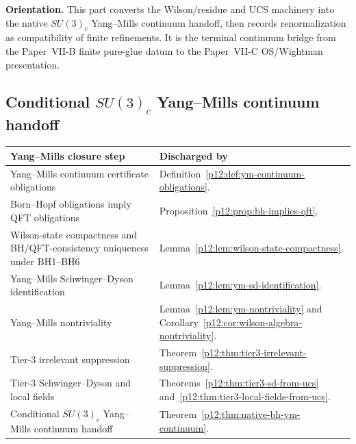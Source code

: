 \documentclass[12pt,a4paper]{article}
\begin{document}
\noindent\textbf{Orientation.}
This part converts the Wilson/residue and UCS machinery into the native \(SU(3)_c\) Yang--Mills continuum handoff, then records renormalization as compatibility of finite refinements.  It is the terminal continuum bridge from the Paper~VII-B finite pure-glue datum to the Paper~VII-C OS/Wightman presentation.


\subsection{Conditional \(SU(3)_c\) Yang--Mills continuum handoff}
\label{p12:sec:ym-identification}


\begin{table}[htbp]
\centering
\small
\begin{tabularx}{\textwidth}{@{}
>{\raggedright\arraybackslash}p{}
>{\raggedright\arraybackslash}X
@{}}
\toprule
\textbf{Yang--Mills closure step} & \textbf{Discharged by} \\
\midrule
Yang--Mills continuum certificate obligations
& Definition~\ref{p12:def:ym-continuum-obligations}. \\

Born--Hopf obligations imply QFT obligations
& Proposition~\ref{p12:prop:bh-implies-qft}. \\

Wilson-state compactness and BH/QFT-consistency uniqueness under BH1--BH6
& Lemma~\ref{p12:lem:wilson-state-compactness}. \\

Yang--Mills Schwinger--Dyson identification
& Lemma~\ref{p12:lem:ym-sd-identification}. \\

Yang--Mills nontriviality
& Lemma~\ref{p12:lem:ym-nontriviality} and
Corollary~\ref{p12:cor:wilson-algebra-nontriviality}. \\

Tier-3 irrelevant suppression
& Theorem~\ref{p12:thm:tier3-irrelevant-suppression}. \\

Tier-3 Schwinger--Dyson and local fields
& Theorems~\ref{p12:thm:tier3-sd-from-ucs}
and~\ref{p12:thm:tier3-local-fields-from-ucs}. \\

Conditional \(SU(3)_c\) Yang--Mills continuum handoff
& Theorem~\ref{p12:thm:native-bh-ym-continuum}. \\


\end{tabularx}
\end{table}
\end{document}
